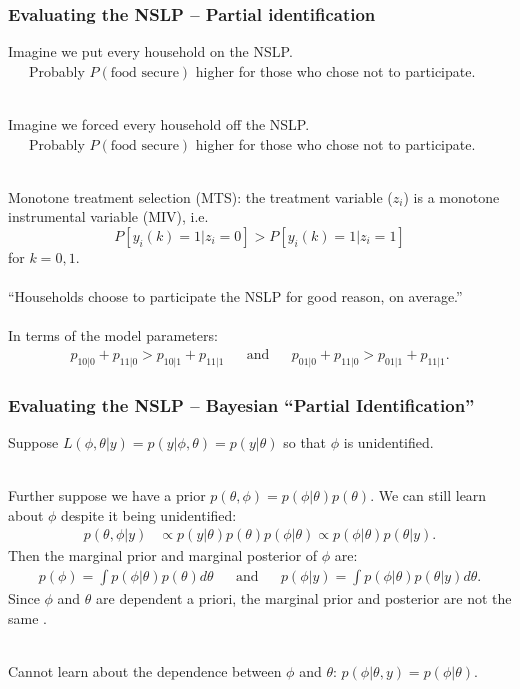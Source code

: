 \documentclass[xcolor=dvipsnames]{beamer}
\begin{document}
\begin{frame}
\frametitle{Evaluating the NSLP -- Partial identification}
Imagine we put every household on the NSLP. \\
\ \ \ Probably $P(\mbox{food secure})$ higher for those who chose not to participate.\\~

\pause Imagine we forced every household off the NSLP. \\
\ \ \ Probably $P(\mbox{food secure})$ higher for those who chose not to participate.\\~


\pause Monotone treatment selection (MTS): the treatment variable ($z_i$) is a monotone instrumental variable (MIV), i.e.
\[
P[y_i(k)=1|z_i=0] > P[y_i(k)=1|z_i=1]
\]
for $k=0,1$.\\~\\

``Households choose to participate the NSLP for good reason, on average.''\\~\\

\pause In terms of the model parameters:
\begin{align*}
  p_{10|0} + p_{11|0} > p_{10|1} + p_{11|1} &&\mbox{and}&&  p_{01|0} + p_{11|0} > p_{01|1} + p_{11|1}.
\end{align*}
\end{frame}


\begin{frame}
\frametitle{Evaluating the NSLP -- Bayesian ``Partial Identification''}
Suppose $L(\phi,\theta|y)=p(y|\phi,\theta)=p(y|\theta)$ so that $\phi$ is unidentified.\\~

Further suppose we have a prior $p(\theta,\phi)=p(\phi|\theta)p(\theta)$. \pause We can still learn about $\phi$ despite it being unidentified:
    \begin{align*}
    p(\theta,\phi|y) &\propto p(y|\theta)p(\theta)p(\phi|\theta) \propto p(\phi|\theta)p(\theta|y).
  \end{align*}
\pause Then the marginal prior and marginal posterior of $\phi$ are:
    \begin{align*}
    p(\phi) = \int p(\phi|\theta)p(\theta)d\theta  &&\mbox{and}&& p(\phi|y) = \int p(\phi|\theta)p(\theta|y)d\theta.
  \end{align*}
Since $\phi$ and $\theta$ are dependent a priori, the marginal prior and posterior are not the same \citep{poirier1998revising}.\\~

\pause Cannot learn about the dependence between $\phi$ and $\theta$: $p(\phi|\theta,y)=p(\phi|\theta)$.

\end{frame}
\end{document}
